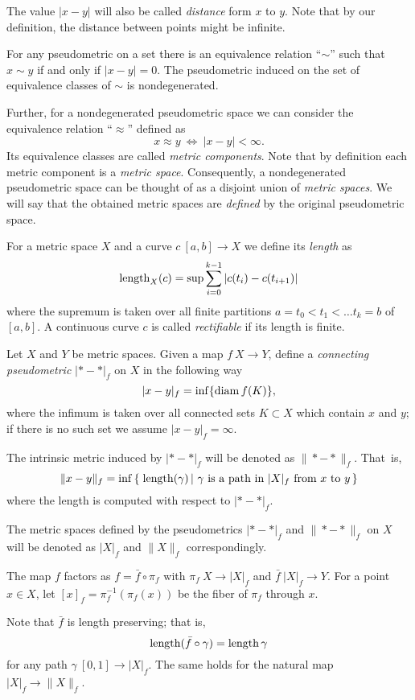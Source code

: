 \documentclass{article}
\begin{document}
The value $|x-y|$ will also be called \emph{distance} form $x$ to $y$.
Note that by our definition, the distance between points might be infinite.

For any pseudometric on a set there is an equivalence relation ``$\sim$'' such that $x\sim y$ if and only if $|x-y|=0$.
The pseudometric induced  on the set of equivalence classes of $\sim$ is nondegenerated.

Further, for a nondegenerated pseudometric space we can consider the equivalence relation ``$\approx$'' defined as \[x\approx y\  \iff\  |x-y|<\infty.\]
Its equivalence classes are called \emph{metric components}.
Note that by definition each metric component is a \emph{metric space}.
Consequently, a nondegenerated pseudometric space can be thought of as a disjoint union of \emph{metric spaces}.
We will say that the obtained metric spaces are \emph{defined} by the  original pseudometric space.%

For a metric space $X$ and a curve $c\:[a,b]\to X$ we define its {\em length} as
\[\mathop{\rm length}\nolimits_X(c)=\sup\sum_{i=0}^{k-1} |c(t_i)-c(t_{i+1})|\]
where the supremum is taken over all finite partitions ${a=t_0<t_1<\ldots t_k=b}$ of $[a,b]$. 
A continuous curve $c$ is called {\em rectifiable} if its length is finite.

Let $X$ and $Y$ be metric spaces.
Given a map $f\:X\to Y$,
define a \emph{connecting pseudometric} $|{*}-{*}|_f$ on $X$ in
the following way
\[|x-y|_f=\inf\{\mathop{\rm diam}\nolimits f(K)\},\]
where the infimum is taken over all connected sets $K\subset X$ which contain $x$ and $y$;
if there is no such set we assume $|x-y|_f=\infty$.

The intrinsic metric induced by $|{*}-{*}|_f$ will be denoted as 
$\|{*}-{*}\|_f$. 
That~is, 
\[\|x-y\|_f=\inf\set{\length(\gamma)}{\gamma\ \text{is a path in}\ |X|_f\ \text{from}\ x \ \text{to}\ y}\]
where the length is computed with respect to $|{*}-{*}|_f$.

The metric spaces defined by the pseudometrics $|{*}-{*}|_f$ 
and $\|{*}-{*}\|_f$ on $X$ will be denoted as $|X|_f$ and $\|X\|_f$ correspondingly.

\medskip

The map $f$ factors as $f=\bar f\circ \pi_f$ with $\pi_f\:X\to|X|_f$ and $\bar f\:|X|_f\to Y$.
For a point $x\in X$, let $[x]_f=\pi_f^{-1}(\pi_f(x))$ be the fiber of $\pi_f$ through $x$.

Note that $\bar f$ is length preserving;
that is,
\[\mathop{\rm length}\nolimits(\bar f\circ\gamma)=\mathop{\rm length}\nolimits\gamma\]
for any path $\gamma\:[0,1]\to |X|_f$.
The same holds for the natural map $|X|_f\to \|X\|_f$.
\end{document}
